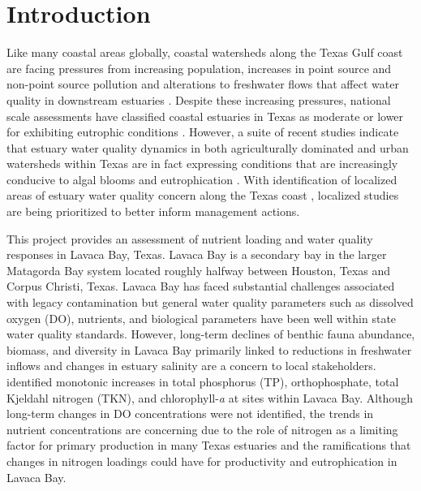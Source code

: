 \documentclass[water,article,submit,oneauthor]{Definitions/mdpi}
\begin{document}

\hypertarget{introduction}{%
\section{Introduction}\label{introduction}}

Like many coastal areas globally, coastal watersheds along the Texas
Gulf coast are facing pressures from increasing population, increases in
point source and non-point source pollution and alterations to
freshwater flows that affect water quality in downstream estuaries
\citep{bricker_effects_2008, kennicuttWaterQualityGulf2017, bugica_water_2020}.
Despite these increasing pressures, national scale assessments have
classified coastal estuaries in Texas as moderate or lower for
exhibiting eutrophic conditions \citep{bricker_effects_2008}. However, a
suite of recent studies indicate that estuary water quality dynamics in
both agriculturally dominated and urban watersheds within Texas are in
fact expressing conditions that are increasingly conducive to algal
blooms and eutrophication
\citep{wetzWaterQualityDynamics2016, wetz_exceptionally_2017, bugica_water_2020, chinPhytoplanktonBiomassCommunity2022}.
With identification of localized areas of estuary water quality concern
along the Texas coast \citep{bugica_water_2020}, localized studies are
being prioritized to better inform management actions.

This project provides an assessment of nutrient loading and water
quality responses in Lavaca Bay, Texas. Lavaca Bay is a secondary bay in
the larger Matagorda Bay system located roughly halfway between Houston,
Texas and Corpus Christi, Texas. Lavaca Bay has faced substantial
challenges associated with legacy contamination but general water
quality parameters such as dissolved oxygen (DO), nutrients, and
biological parameters have been well within state water quality
standards. However, long-term declines of benthic fauna abundance,
biomass, and diversity in Lavaca Bay primarily linked to reductions in
freshwater inflows and changes in estuary salinity
\citep{beserespollackLongtermTrendsResponse2011, palmerImpactsDroughtsLow2015, montagnaAssessmentRelationshipFreshwater2020}
are a concern to local stakeholders. \citet{bugica_water_2020}
identified monotonic increases in total phosphorus (TP), orthophosphate,
total Kjeldahl nitrogen (TKN), and chlorophyll-\emph{a} at sites within
Lavaca Bay. Although long-term changes in DO concentrations were not
identified, the trends in nutrient concentrations are concerning due to
the role of nitrogen as a limiting factor for primary production in many
Texas estuaries
\citep{gardnerNitrogenFixationDissimilatory2006, houTransformationFateNitrate2012, doradoUnderstandingInteractionsFreshwater2015, paudelRelationshipSuspendedSolids2019, wetz_exceptionally_2017}
and the ramifications that changes in nitrogen loadings could have for
productivity and eutrophication in Lavaca Bay.
\end{document}
